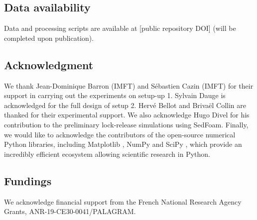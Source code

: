 \documentclass[12pt]{article}
\begin{document}


\subsection*{Data availability}

Data and processing scripts are available at [public repository DOI] (will be completed upon publication).

\subsection*{Acknowledgment}
We thank Jean-Dominique Barron (IMFT) and Sébastien Cazin (IMFT) for their support in carrying out the experiments on setup-up 1.
%
Sylvain Dauge is acknowledged for the full design of setup 2. Hervé Bellot and Brivaël Collin are thanked for their experimental support.
%
We also acknowledge Hugo Divel for his contribution to the preliminary lock-release simulations using SedFoam.
%
Finally, we would like to acknowledge the contributors of the open-source numerical Python libraries, including Matplotlib \citep{Hunter2007}, NumPy \citep{Harris2020} and SciPy \citep{Virtanen2020}, which provide an incredibly efficient ecosystem allowing scientific research in Python.

\subsection*{Fundings}
We acknowledge financial support from the French National Research Agency Grants, ANR-19-CE30-0041/PALAGRAM.



\end{document}
